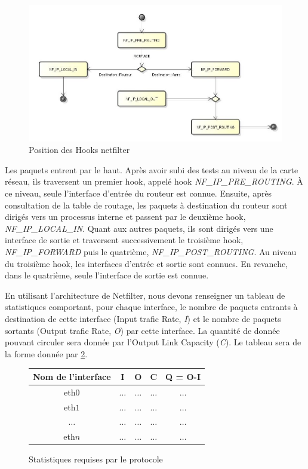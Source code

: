 \documentclass[a4paper]{article}
\begin{document}
\begin{figure}[!ht]
	\centering
	\includegraphics[scale=.5]{hooks.jpg}
	\caption{\label{hooks} Position des Hooks netfilter}
\end{figure}

Les paquets entrent par le haut. Après avoir subi des tests au
niveau de la carte réseau, ils traversent un premier hook, appelé
hook \textit{NF\_IP\_PRE\_ROUTING}. À ce niveau, seule l'interface
d'entrée du routeur est connue. Ensuite, après consultation de
la table de routage, les paquets à destination du routeur sont
dirigés vers un processus interne et passent par le deuxième hook,
\textit{NF\_IP\_LOCAL\_IN}. Quant aux autres paquets, ils sont dirigés
vers une interface de sortie et traversent successivement le troisième
hook, \textit{NF\_IP\_FORWARD} puis le quatrième,
\textit{NF\_IP\_POST\_ROUTING}. Au niveau du troisième hook, les
interfaces d'entrée et sortie sont connues. En revanche, dans
le quatrième, seule l'interface de sortie est connue.

En utilisant l'architecture de Netfilter, nous devons renseigner
un tableau de statistiques comportant, pour chaque interface, le
nombre de paquets entrants à destination de cette interface
(Input trafic Rate, \textit{I}) et le nombre de paquets sortants
(Output trafic Rate, \textit{O}) par cette interface. La quantité
de donnée pouvant circuler sera donnée par l'Output Link Capacity
(\textit{C}). Le tableau sera de la forme donnée par \ref{stats}.

\begin{figure}
	\centering
	\begin{tabular}{c|c|c|c|c}
		Nom de l'interface & I & O & C & Q = O-I \\
		\hline
		eth$0$ & $\ldots$ & $\ldots$ & $\ldots$ & $\ldots$ \\
		eth$1$ & $\ldots$ & $\ldots$ & $\ldots$ & $\ldots$ \\
		$\ldots$ & $\ldots$ & $\ldots$ & $\ldots$ & $\ldots$ \\
		eth$n$ & $\ldots$ & $\ldots$ & $\ldots$ & $\ldots$ \\
	\end{tabular}
	\caption{\label{stats} Statistiques requises par le protocole}
\end{figure}
\end{document}
